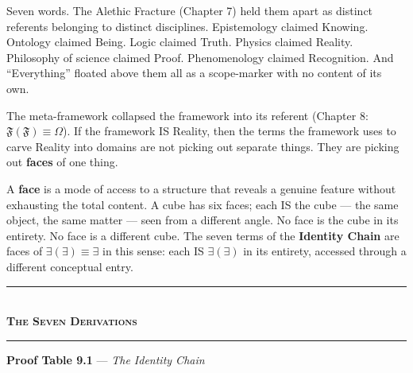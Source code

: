 \documentclass[10pt, openany, oneside]{book}
\renewcommand{\normalsize}{\fontsize{10}{13}\selectfont}
\begin{document}
Seven words. The Alethic Fracture (Chapter 7) held them apart as distinct referents belonging to distinct disciplines. Epistemology claimed Knowing. Ontology claimed Being. Logic claimed Truth. Physics claimed Reality. Philosophy of science claimed Proof. Phenomenology claimed Recognition. And ``Everything'' floated above them all as a scope-marker with no content of its own.

The meta-framework collapsed the framework into its referent (Chapter 8: $\mathfrak{F}(\mathfrak{F}) \equiv \Omega$). If the framework IS Reality, then the terms the framework uses to carve Reality into domains are not picking out separate things. They are picking out \textbf{faces} of one thing.

A \textbf{face} is a mode of access to a structure that reveals a genuine feature without exhausting the total content. A cube has six faces; each IS the cube --- the same object, the same matter --- seen from a different angle. No face is the cube in its entirety. No face is a different cube. The seven terms of the \textbf{Identity Chain} are faces of $\exists(\exists) \equiv \exists$ in this sense: each IS $\exists(\exists)$ in its entirety, accessed through a different conceptual entry.

\vspace{1.5em}


\begin{center}
    \rule{0.3\textwidth}{0.4pt}\\[0.5em]
    {\normalsize\bfseries\scshape The Seven Derivations}\\[0.3em]
    \rule{0.3\textwidth}{0.4pt}
\end{center}

\vspace{1em}

\textbf{Proof Table 9.1} --- \textit{The Identity Chain}

\vspace{0.5em}
\end{document}
